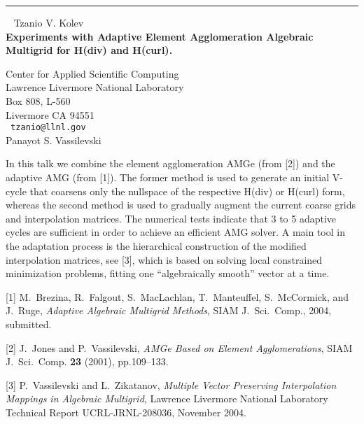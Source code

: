 \documentclass{report}
\begin{document}
\begin{center}

\rule{6in}{1pt} \
{\large
Tzanio V. Kolev
\\ {\bf
Experiments with Adaptive Element Agglomeration Algebraic Multigrid for
H(div) and H(curl).
}}

Center for Applied Scientific Computing \\
Lawrence Livermore National Laboratory \\
Box 808, L-560 \\ Livermore CA 94551
\\ {\tt
tzanio@llnl.gov
}
\\
Panayot S. Vassilevski
\end{center}

In this talk we combine the element agglomeration AMGe (from [2]) and
the adaptive AMG (from [1]). The former method is used to generate an
initial V-cycle that coarsens only the nullspace of the respective
H(div) or H(curl) form, whereas the second method is used to gradually
augment the current coarse grids and interpolation matrices. The
numerical tests indicate that 3 to 5 adaptive cycles are sufficient in
order to achieve an efficient AMG solver. A main tool in the adaptation
process is the hierarchical construction of the modified interpolation
matrices, see [3], which is based on solving local constrained
minimization problems, fitting one ``algebraically smooth'' vector at a
time.

[1] M.~Brezina, R.~Falgout, S.~MacLachlan, T.~Manteuffel, S.~McCormick,
and J.~Ruge, {\em Adaptive Algebraic Multigrid Methods},
SIAM J.~Sci.~Comp., 2004, submitted.

[2] J.~Jones and P.~Vassilevski, {\em AMGe Based on Element
Agglomerations}, SIAM J.~Sci.~Comp. {\bf 23} (2001), pp.109--133.

[3] P.~Vassilevski and L.~Zikatanov,
{\em Multiple Vector Preserving
Interpolation Mappings in Algebraic Multigrid},
Lawrence Livermore
National Laboratory Technical Report UCRL-JRNL-208036, November 2004.
\end{document}
